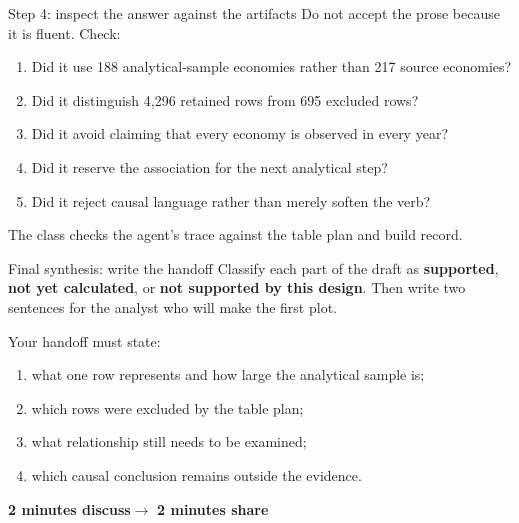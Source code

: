 \begin{frame}{Step 4: inspect the answer against the artifacts}
  Do not accept the prose because it is fluent. Check:
  \begin{enumerate}
    \item Did it use 188 analytical-sample economies rather than 217 source economies?
    \item Did it distinguish 4,296 retained rows from 695 excluded rows?
    \item Did it avoid claiming that every economy is observed in every year?
    \item Did it reserve the association for the next analytical step?
    \item Did it reject causal language rather than merely soften the verb?
  \end{enumerate}

  \vfill
  The class checks the agent's trace against the table plan and build record.
\end{frame}

\begin{frame}{Final synthesis: write the handoff}
  Classify each part of the draft as \textbf{supported},
  \textbf{not yet calculated}, or \textbf{not supported by this design}. Then
  write two sentences for the analyst who will make the first plot.

  \vspace{0.5em}
  Your handoff must state:
  \begin{enumerate}
    \item what one row represents and how large the analytical sample is;
    \item which rows were excluded by the table plan;
    \item what relationship still needs to be examined;
    \item which causal conclusion remains outside the evidence.
  \end{enumerate}

  \vfill
  \centering
  \textbf{2 minutes discuss}\qquad$\longrightarrow$\qquad
  \textbf{2 minutes share}
\end{frame}

